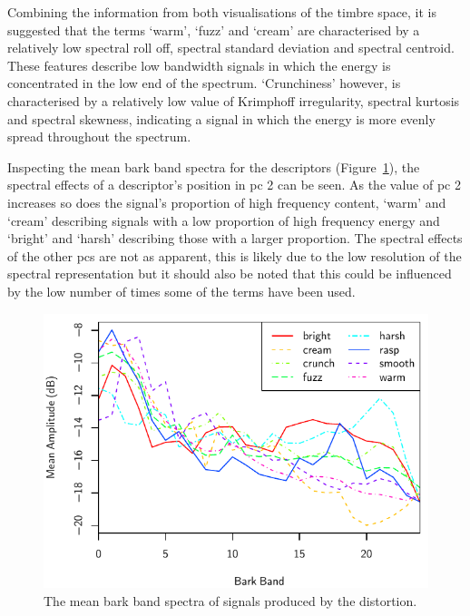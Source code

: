			Combining the information from both visualisations of the timbre space, it is suggested that the
			terms `warm', `fuzz' and `cream' are characterised by a relatively low spectral roll off, spectral
			standard deviation and spectral centroid. These features describe low bandwidth signals in which
			the energy is concentrated in the low end of the spectrum. `Crunchiness' however, is characterised
			by a relatively low value of Krimphoff irregularity, spectral kurtosis and spectral skewness,
			indicating a signal in which the energy is more evenly spread throughout the spectrum.

			Inspecting the mean bark band spectra for the descriptors
			(Figure~\ref{fig:DistortionProcessedSpectra}), the spectral effects of a descriptor's position in
			\acrshort{pc} 2 can be seen. As the value of \acrshort{pc} 2 increases so does the signal's
			proportion of high frequency content, `warm' and `cream' describing signals with a low proportion
			of high frequency energy and `bright' and `harsh' describing those with a larger proportion. The
			spectral effects of the other \acrshort{pc}s are not as apparent, this is likely due to the low
			resolution of the spectral representation but it should also be noted that this could be influenced
			by the low number of times some of the terms have been used.

			\begin{figure}[h!]
				\centering
				\includegraphics{chapter4/Images/DistortionProcessedSpectra.pdf}
				\caption{The mean bark band spectra of signals produced by the distortion.}
				\label{fig:DistortionProcessedSpectra}
			\end{figure}

